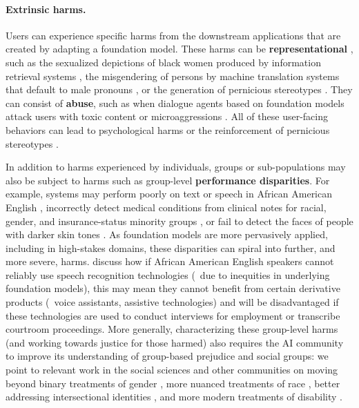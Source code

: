 \paragraph{Extrinsic harms.}
Users can experience specific harms from the downstream applications that are created by adapting a foundation model.  
These harms can be \textbf{representational}  \citep{barocas17,crawford17,blodgett_language_2020}, such as the sexualized depictions of black women produced by information retrieval systems \citep{noble}, the misgendering of persons by machine translation systems that default to male pronouns \cite{schiebinger13,schiebinger14}, or the generation of pernicious stereotypes \citep{nozza21,sheng-etal-2019-woman, abid2021}. 
They can consist of \textbf{abuse}, such as when dialogue agents based on foundation models attack users with toxic content \cite{dinan21,gehman-etal-2020-realtoxicityprompts} or microaggressions \citep{breitfeller-etal-2019-finding,jurgens-etal-2019-just}.
All of these user-facing behaviors can lead to psychological harms or the reinforcement of pernicious stereotypes \cite{spencer2016stereotype,williams2020psychology}.

In addition to harms experienced by individuals, groups or sub-populations may also be subject to harms such as group-level \textbf{performance disparities}.
For example, systems may perform poorly on text or speech in African American English \citep{blodgett17,koenecke2020racial}, incorrectly detect medical conditions from clinical notes for racial, gender, and insurance-status minority groups \citep{zhang2020hurtful}, or fail to detect the faces of people with darker skin tones \citep{wilson19,buolamwini2018gender}. 
As foundation models are more pervasively applied, including in high-stakes domains, these disparities can spiral into further, and more severe, harms. 
\citet{koenecke2020racial} discuss how if African American English speakers cannot reliably use speech recognition technologies (\eg~due to inequities in underlying foundation models), this may mean they cannot benefit from certain derivative products (\eg~voice assistants, assistive technologies) and will be disadvantaged if these technologies are used to conduct interviews for employment or transcribe courtroom proceedings.
More generally, characterizing these group-level harms (and working towards justice for those harmed) also requires the AI community to improve its understanding of group-based prejudice \citep{allport1954} and social groups: we point to relevant work in the social sciences and other communities on moving beyond binary treatments of gender \citep{lindsey2015, westbrook2015, richards2017, darwin2017, Keyes2018, hyde2019, cao2020, dinan2020}, more nuanced treatments of race \citep[\eg][]{penner2008, freeman2011,  saperstein2012, saperstein2013, penner2015, field2021}, better addressing intersectional identities \citep[\eg][]{crenshaw1989, nash2008, gines2011, penner2013, ghavami2013, bright2016, buolamwini2018gender, may2019, oconnor2019, guo2020}, and more modern treatments of disability \citep[\eg][]{batterbury2012, spiel2019, hutchinson2020}. 


